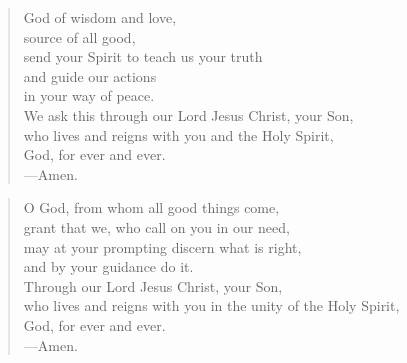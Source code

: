 \prayer

\setlength{\leftmargini}{\prayerleftmargini}

\begin{verse}
God of wisdom and love,\\
source of all good,\\
send your Spirit to teach us your truth\\
and guide our actions\\
in your way of peace.\\
We ask this through our Lord Jesus Christ, your Son,\\
who lives and reigns with you and the Holy Spirit,\\
God, for ever and ever.\\
{\color{red}---\thinspace}Amen.
\end{verse}


\begin{verse}
O God, from whom all good things come,\\
grant that we, who call on you in our need,\\
may at your prompting discern what is right,\\
and by your guidance do it.\\
Through our Lord Jesus Christ, your Son,\\
who lives and reigns with you in the unity of the Holy Spirit,\\
God, for ever and ever.\\
{\color{red}---\thinspace}Amen.
\end{verse}

\setlength{\leftmargini}{\defleftmargini}